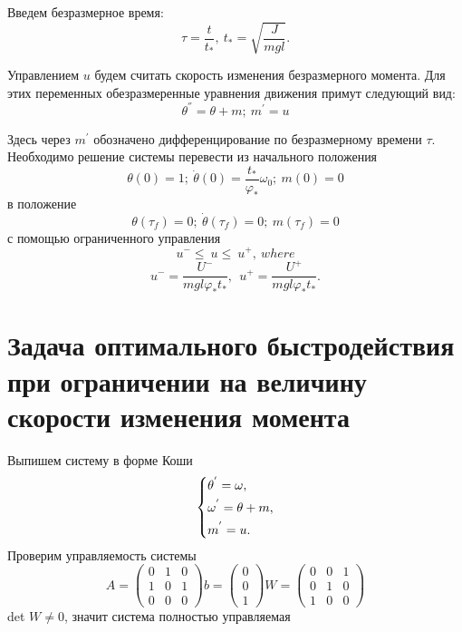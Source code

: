 \documentclass[a4paper,12pt]{article}
\theoremstyle{plain} %
\theoremstyle{definition} %
\theoremstyle{remark} %
\begin{document}
{Введем безразмерное время:
\[
    \tau=\frac{t}{t_\ast},\ t_\ast=\sqrt{\frac{J}{mgl}}.
\]

Управлением $u$ будем считать скорость изменения безразмерного
момента. Для этих переменных обезразмеренные уравнения движения
примут следующий вид:
\[
    \theta^{''}=\theta+m;\ m^{'}=u
\]

Здесь через $m^{'}$ обозначено дифференцирование по
безразмерному времени $\tau$. Необходимо решение системы
перевести из начального положения
\begin{equation}\label{9}
    \theta\left(0\right)=1;\ \dot{\theta}\left(0\right)=\frac{t_\ast}{\varphi_\ast}\omega_0;\ m\left(0\right)=0
\end{equation}
в положение
\begin{equation}\label{9}
    \theta\left(\tau_f\right)=0;\ \dot{\theta}\left(\tau_f\right)=0;\ m\left(\tau_f\right)=0
\end{equation}
с помощью ограниченного управления
\[
    u^-\le\ u\le\ u^+,\ where
\]
\[
    u^-=\frac{U^-}{mgl\varphi_\ast t_\ast},\ \ u^+=\frac{U^+}{mgl\varphi_\ast t_\ast}.
\]
\newpage
\section{Задача оптимального быстродействия при ограничении на величину скорости изменения момента}
Выпишем систему в форме Коши
\begin{equation}\label{koshisystem}
    \left\{ {\begin{aligned}
                 & \theta^{'} = \omega , \hfill   \\
                 & \omega^{'} = \theta+m , \hfill \\
                 & m^{'} = u . \hfill             \\
            \end{aligned}} \right.
\end{equation}
Проверим управляемость системы
\begin{equation*}
    A =
    \begin{pmatrix}
        0 & 1 & 0 \\
        1 & 0 & 1 \\
        0 & 0 & 0
    \end{pmatrix}
    b =
    \begin{pmatrix}
        0 \\
        0 \\
        1
    \end{pmatrix}
    W =
    \begin{pmatrix}
        0 & 0 & 1 \\
        0 & 1 & 0 \\
        1 & 0 & 0
    \end{pmatrix}
\end{equation*}
det $W\neq0$, значит система полностью управляемая

}
\end{document}
